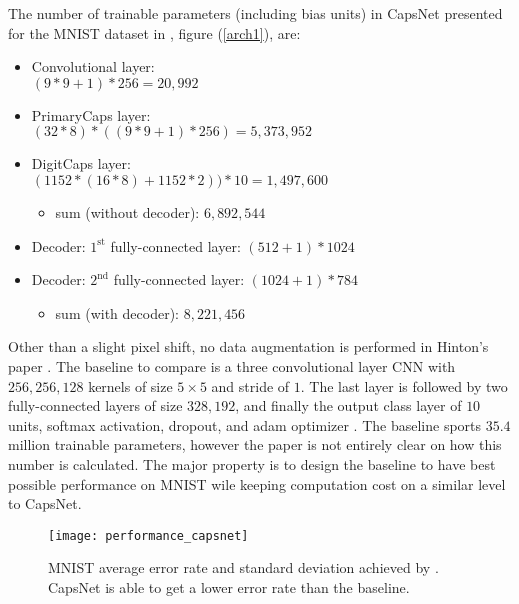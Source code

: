 \documentclass{article}
\begin{document}
{The number of trainable parameters (including bias units) in CapsNet presented for the MNIST dataset in \cite{hinton17}, figure (\ref{arch1}), are:
\begin{itemize}
\item Convolutional layer: \\
$(9*9+1)*256=20,992$ 
\item PrimaryCaps layer: \\
$(32*8)*((9*9+1)*256)=5,373,952$
\item DigitCaps layer: \\
$(1152*(16*8) + 1152*2))*10 = 1,497,600$ 
\begin{itemize}
\item sum (without decoder): $6,892,544$
\end{itemize}
\item Decoder: $1^{\text{st}}$ fully-connected layer: $(512+1)*1024$
\item Decoder: $2^{\text{nd}}$ fully-connected layer:
$(1024+1)*784$
\begin{itemize}
\item sum (with decoder): $8,221,456$
\end{itemize}
\end{itemize}

Other than a slight pixel shift, no data augmentation is performed in Hinton's paper \cite{hinton17}. The baseline to compare is a three convolutional layer CNN with $256, 256, 128$ kernels of size $5\times5$ and stride of $1$. The last layer is followed by two fully-connected layers of size $328, 192$, and finally the output class layer of $10$ units, softmax activation, dropout, and adam optimizer \cite{hinton17}. The baseline sports $35.4$ million trainable parameters, however the paper \cite{hinton17} is not entirely clear on how this number is calculated. The major property is to design the baseline to have best possible performance on MNIST wile keeping computation cost on a similar level to CapsNet.


\begin{figure}[!htb]
\vskip 0.2in
\begin{center}
\centerline{\texttt{[image: performance\_capsnet]}}
\caption{MNIST average error rate and standard deviation achieved by \cite{hinton17}. CapsNet is able to get a lower error rate than the baseline.}\label{MNIST_performance}
\end{center}
\vskip -0.2in
\end{figure}

}
\end{document}
